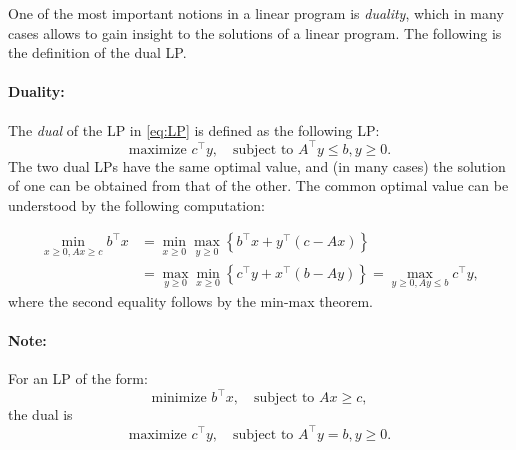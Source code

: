 One of the most important notions in a linear program is \textit{duality}, which in many cases allows to gain insight to the solutions of a linear program. The following is the definition of the dual LP.

\paragraph{Duality:} The \emph{dual} of the LP in \eqref{eq:LP} is defined as the following LP:
\begin{equation}\label{eq:LP_dual}
\textrm{maximize } {c^\top}y,   \quad \textrm{subject to } {A^\top}y
\le b,  y \ge 0.
\end{equation}
The two dual LPs have the same optimal value, and (in many cases)
the solution of one can be obtained from that of the other. The
common optimal value can be understood by the following computation:

\begin{align*}
\mathop {\min }\limits_{x \ge 0,Ax \ge c} {b^\top}x &= \mathop {\min }\limits_{x \ge 0} \mathop {\max }\limits_{y \ge 0} \left\{ {{b^\top}x + {y^\top}(c - Ax)} \right\}\\
 &= \mathop {\max }\limits_{y \ge 0} \mathop {\min }\limits_{x \ge 0} \left\{ {{c^\top}y + {x^\top}(b - Ay)} \right\} = \mathop {\max }\limits_{y \ge 0,Ay \le b} {c^\top}y,
\end{align*}
where the second equality follows by the min-max theorem.

\paragraph{Note:} For an LP of the form:
\begin{equation*}
 \textrm{minimize } {b^\top}x,   \quad \textrm{subject to } Ax \ge c,
\end{equation*}
the dual is
\begin{equation*}
\textrm{maximize } {c^\top}y,   \quad \textrm{subject to } {A^\top}y
= b,  y \ge 0.
\end{equation*}


